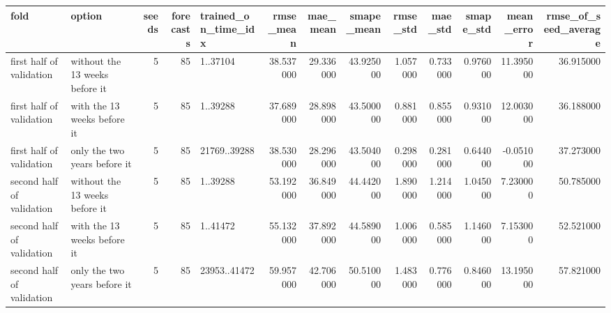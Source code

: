 \begin{tabular}{llrrlrrrrrrrr}
\toprule
fold & option & seeds & forecasts & trained_on_time_idx & rmse_mean & mae_mean & smape_mean & rmse_std & mae_std & smape_std & mean_error & rmse_of_seed_average \\
\midrule
first half of validation & without the 13 weeks before it & 5 & 85 & 1..37104 & 38.537000 & 29.336000 & 43.925000 & 1.057000 & 0.733000 & 0.976000 & 11.395000 & 36.915000 \\
first half of validation & with the 13 weeks before it & 5 & 85 & 1..39288 & 37.689000 & 28.898000 & 43.500000 & 0.881000 & 0.855000 & 0.931000 & 12.003000 & 36.188000 \\
first half of validation & only the two years before it & 5 & 85 & 21769..39288 & 38.530000 & 28.296000 & 43.504000 & 0.298000 & 0.281000 & 0.644000 & -0.051000 & 37.273000 \\
second half of validation & without the 13 weeks before it & 5 & 85 & 1..39288 & 53.192000 & 36.849000 & 44.442000 & 1.890000 & 1.214000 & 1.045000 & 7.230000 & 50.785000 \\
second half of validation & with the 13 weeks before it & 5 & 85 & 1..41472 & 55.132000 & 37.892000 & 44.589000 & 1.006000 & 0.585000 & 1.146000 & 7.153000 & 52.521000 \\
second half of validation & only the two years before it & 5 & 85 & 23953..41472 & 59.957000 & 42.706000 & 50.510000 & 1.483000 & 0.776000 & 0.846000 & 13.195000 & 57.821000 \\
\bottomrule
\end{tabular}
